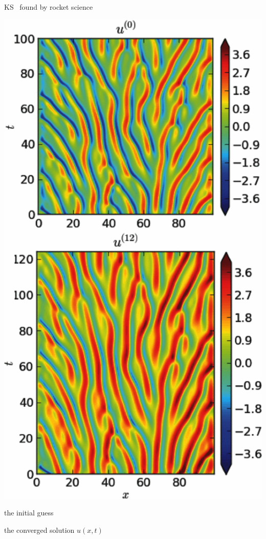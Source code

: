 \begin{frame}{KS \twots\ found by rocket science}

\begin{minipage}[height=.52\textheight]{.30\textwidth}
\centering
\includegraphics[width=\textwidth,height=.70\textheight]{WGBGQ13fig18}
\end{minipage}
\begin{minipage}[height=.52\textheight]{.60\textwidth}
the initial guess

\bigskip

 the converged solution  $u(x,t)$
\end{minipage}
\end{frame}


